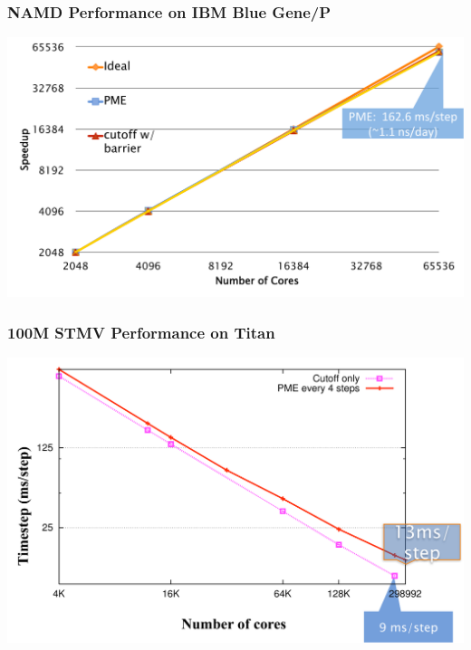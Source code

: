{\begin{frame}[t]
\frametitle{NAMD Performance on IBM Blue Gene/P}
  \begin{center} \includegraphics[width=.8\textwidth]{figures/namd_bgp.pdf} \end{center}
\end{frame}

\begin{frame}[t]
\frametitle{100M STMV Performance on Titan}
  \begin{center} \includegraphics[width=.8\textwidth]{figures/namd_titan.pdf} \end{center}
\end{frame}
}
